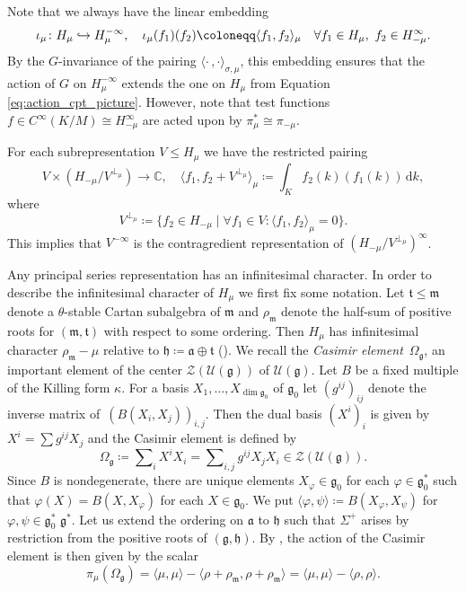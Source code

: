 \documentclass[JEP,XML,SOM,NoFloatCountersInSection,Unicode,published]{cedram}
\def\hto{\mathrel{\lhook\joinrel\to}}
\theoremstyle{definition}
\newcommand{\mc}[1]{\ensuremath{\mathcal{#1}}}
\newcommand{\mf}[1]{\ensuremath{\mathfrak{#1}}}
\newcommand{\rhoa}{\ensuremath{\rho}}
\newcommand{\C}{\ensuremath{\mathbb{C}}}
\newcommand{\ps}[2]{\ensuremath{H_{#2}}}
\newcommand{\pss}[2]{\ensuremath{H_{#2}^\infty}}
\newcommand{\psd}[2]{\ensuremath{H_{#2}^{-\infty}}}
\newcommand{\psts}[1]{\ensuremath{H_{#1}^\infty}}
\newcommand{\intd}{\ensuremath{\,\mathrm{d}}}
\begin{document}
Note that we always have the linear embedding
\[
\iota_{\mu}\colon\ps{\sigma}{\mu}\hto\psd{\sigma}{\mu},\quad\iota_{\mu}(f_1)(f_2)\coloneqq\langle f_1,f_2\rangle_{\mu}\quad \forall f_1\in\ps{\sigma}{\mu},\ f_2\in\pss{\tilde\sigma}{-\mu}.
\]
By the $G$-invariance of the pairing $\langle\cdot\,,\cdot\rangle_{\sigma,\mu}$, this embedding ensures that the action of $G$ on $\psd{\sigma}{\mu}$ extends the one on $\ps{\sigma}{\mu}$ from Equation \eqref{eq:action_cpt_picture}. However, note that test functions $f\in C^\infty(K/M)\cong\psts{-\mu}$ are acted upon by $\pi_{\mu}^*\cong\pi_{-\mu}$.

For each subrepresentation $V\leq\ps{\sigma}{\mu}$ we have the restricted pairing
\[
V\times(\ps{\tilde\sigma}{-\mu}/V^{\perp_{\mu}})\to\C,\quad \langle f_1,f_2+V^{\perp_{\mu}}\rangle_{\mu}\coloneqq\int_K f_2(k)(f_1(k))\intd k,
\]
where
\begin{equation}\label{eq:perp_ps}
V^{\perp_{\mu}}\coloneqq\{f_2\in\ps{\tilde\sigma}{-\mu}\mid\forall f_1\in V\colon\langle f_1,f_2\rangle_{\mu}=0\}.
\end{equation}
This implies that $V^{-\infty}$ is the contragredient representation of $(\ps{\tilde\sigma}{-\mu}/V^{\perp_{\mu}})^\infty$.

Any principal series representation has an infinitesimal character. In order to \hbox{describe} the infinitesimal character of $\ps{\sigma}{\mu}$ we first fix some notation. Let $\mf t\leq\mf m$ \hbox{denote} a $\theta$-stable Cartan subalgebra of $\mf m$ and $\rho_{\mf m}$ denote the half-sum of positive roots for $(\mf m,\mf t)$ with respect to some ordering. Then $\ps{\sigma}{\mu}$ has infinitesimal character $\rho_{\mf m}-\mu$ relative to $\mf h\coloneqq\mf a\oplus\mf t$ (\cf \cite[Prop.\,8.22]{Kna86}). We recall the \emph{Casimir element}~$\Omega_{\mf g}$, an important element of the center $\mc Z(\mc U(\mf g))$ of $\mc U(\mf g)$. Let $B$ be a fixed multiple of the Killing form $\kappa$. For a basis $X_1,\ldots,X_{\dim\mf g_0}$ of $\mf g_0$ let $(g^{ij})_{ij}$ denote the inverse \hbox{matrix} of~$(B(X_i,X_j))_{i,j}$. Then the dual basis $(X^i)_i$ is given by $X^i=\sum g^{ij}X_j$ and the Casimir element is defined by
\[
\Omega_{\mf g}\coloneqq\sum\nolimits_{i}X^iX_i=\sum\nolimits_{i,j}g^{ij}X_jX_i\in\mc Z(\mc U(\mf g)).
\]
Since $B$ is nondegenerate, there are unique elements $X_\varphi\in\mf g_0$ for each $\varphi\in\mf g_0^*$ such that $\varphi(X)=B(X,X_\varphi)$ for each $X\in\mf g_0$. We put $\langle\varphi,\psi\rangle\coloneqq B(X_\varphi,X_\psi)$ for $\varphi,\psi\in\mf g_0^*$ \resp $\mf g^*$. Let us extend the ordering on $\mf a$ to $\mf h$ such that $\Sigma^+$ arises by restriction from the positive roots of $(\mf g,\mf h)$. By \cite[Lem.\,12.28]{Kna86}, the action of the Casimir element is then given by the scalar
\[
\pi_{\mu}(\Omega_{\mf g})=\langle\mu,\mu\rangle-\langle\rhoa+\rho_{\mf m},\rhoa+\rho_{\mf m}\rangle=\langle\mu,\mu\rangle-\langle\rhoa,\rhoa\rangle.
\]
\end{document}
